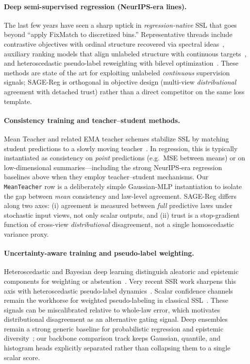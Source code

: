 \documentclass{article}
\begin{document}
\paragraph{Deep semi-supervised regression (NeurIPS-era lines).}
The last few years have seen a sharp uptick in \emph{regression-native} SSL that
goes beyond ``apply FixMatch to discretized bins.'' Representative threads
include contrastive objectives with ordinal structure recovered via spectral
ideas~\citep{dai2023semisupervised}, auxiliary ranking models that align
unlabeled structure with continuous targets~\citep{huang2024rankup}, and
heteroscedastic pseudo-label reweighting with bilevel
optimization~\citep{sun2025heteroscedastic}. These methods are state of the art
for exploiting unlabeled \emph{continuous} supervision signals; SAGE-Reg is
orthogonal in objective design (multi-view \emph{distributional} agreement with
detached trust) rather than a direct competitor on the same loss template.

\paragraph{Consistency training and teacher--student methods.}
Mean Teacher and related EMA teacher schemes stabilize SSL by matching student
predictions to a slowly moving teacher~\citep{tarvainen2017mean}. In regression,
this is typically instantiated as consistency on \emph{point} predictions (e.g.\
MSE between means) or on low-dimensional summaries---including the strong
NeurIPS-era regression baselines above when they employ teacher--student
mechanisms. Our \texttt{MeanTeacher} row is a deliberately simple Gaussian-MLP
instantiation to isolate the gap between \emph{mean} consistency and law-level
agreement. SAGE-Reg differs along two axes: (i) agreement is measured between
\emph{full} predictive laws under stochastic input views, not only scalar
outputs, and (ii) trust is a stop-gradient function of cross-view
\emph{distributional} disagreement, not a single homoscedastic variance proxy.

\paragraph{Uncertainty-aware training and pseudo-label weighting.}
Heteroscedastic and Bayesian deep learning distinguish aleatoric and epistemic
components for weighting or abstention~\citep{kendall2017multi}. Very recent SSR
work sharpens this axis with heteroscedastic pseudo-label
dynamics~\citep{sun2025heteroscedastic}. Scalar confidence channels remain the
workhorse for weighted pseudo-labeling in classical
SSL~\citep{chapelle2006semisupervised}. These signals can be miscalibrated
relative to whole-law error, which motivates distributional disagreement as an
alternative gating signal. Deep ensembles remain a strong generic baseline for
probabilistic regression and epistemic diversity~\citep{lakshminarayanan2017deep};
our backbone comparison track keeps Gaussian, quantile, and histogram heads
explicitly separated rather than collapsing them to a single scalar score.
\end{document}
